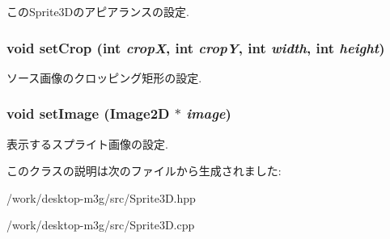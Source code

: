 このSprite3Dのアピアランスの設定. \hypertarget{classm3g_1_1Sprite3D_92660f9625c68b0169ee84bbc4586187}{
\subsubsection[{setCrop}]{\setlength{\rightskip}{0pt plus 5cm}void setCrop (int {\em cropX}, \/  int {\em cropY}, \/  int {\em width}, \/  int {\em height})}}
\label{classm3g_1_1Sprite3D_92660f9625c68b0169ee84bbc4586187}


ソース画像のクロッピング矩形の設定. \hypertarget{classm3g_1_1Sprite3D_705b89b41cd1b38f664ed912be44baaa}{
\subsubsection[{setImage}]{\setlength{\rightskip}{0pt plus 5cm}void setImage ({\bf Image2D} $\ast$ {\em image})}}
\label{classm3g_1_1Sprite3D_705b89b41cd1b38f664ed912be44baaa}


表示するスプライト画像の設定. 

このクラスの説明は次のファイルから生成されました:\begin{CompactItemize}
\item 
/work/desktop-m3g/src/Sprite3D.hpp\item 
/work/desktop-m3g/src/Sprite3D.cpp\end{CompactItemize}
